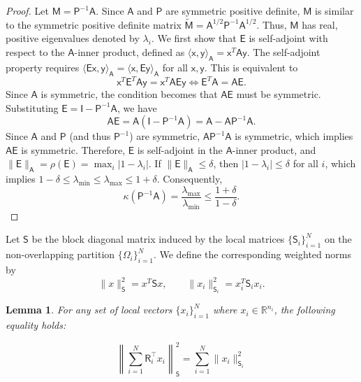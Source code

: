 \documentclass[preprint,12pt]{elsarticle}
\newtheorem{lemma}[theorem]{Lemma} %
\begin{document}
  \begin{proof}
    Let $\mathsf{M}= \mathsf{P}^{-1}\mathsf{A}$. Since $\mathsf{A}$ and
    $\mathsf{P}$ are symmetric positive definite, $\mathsf{M}$ is similar to the
    symmetric positive definite matrix $\widetilde{\mathsf{M}}= \mathsf{A}^{1/2}\mathsf{P}
    ^{-1}\mathsf{A}^{1/2}$. Thus, $\mathsf{M}$ has real, positive eigenvalues
    denoted by $\lambda_{i}$. We first show that $\mathsf{E}$ is self-adjoint with
    respect to the $\mathsf{A}$-inner product, defined as
    $\langle \mathsf{x}, \mathsf{y}\rangle_{\mathsf{A}}= \mathsf{x}^{T}\mathsf{A}
    \mathsf{y}$. The self-adjoint property requires $\langle \mathsf{E}\mathsf{x}
    , \mathsf{y}\rangle_{\mathsf{A}}= \langle \mathsf{x}, \mathsf{E}\mathsf{y}\rangle
    _{\mathsf{A}}$ for all $\mathsf{x}, \mathsf{y}$. This is equivalent to
    \[
      \mathsf{x}^{T}\mathsf{E}^{T}\mathsf{A}\mathsf{y}= \mathsf{x}^{T}\mathsf{A}\mathsf{E}
      \mathsf{y}\iff \mathsf{E}^{T}\mathsf{A}= \mathsf{A}\mathsf{E}.
    \]
    Since $\mathsf{A}$ is symmetric, the condition becomes that $\mathsf{A}\mathsf{E}$
    must be symmetric. Substituting
    $\mathsf{E}= \mathsf{I}- \mathsf{P}^{-1}\mathsf{A}$, we have
    \[
      \mathsf{A}\mathsf{E}= \mathsf{A}(\mathsf{I}- \mathsf{P}^{-1}\mathsf{A})= \mathsf{A}
      - \mathsf{A}\mathsf{P}^{-1}\mathsf{A}.
    \]
    Since $\mathsf{A}$ and $\mathsf{P}$ (and thus $\mathsf{P}^{-1}$) are symmetric,
    $\mathsf{A}\mathsf{P}^{-1}\mathsf{A}$ is symmetric, which implies $\mathsf{A}
    \mathsf{E}$ is symmetric. Therefore, $\mathsf{E}$ is self-adjoint in the $\mathsf{A}$-inner
    product, and
    $\|\mathsf{E}\|_{\mathsf{A}}= \rho(\mathsf{E})= \max_{i}|1 - \lambda_{i}|$. If
    $\|\mathsf{E}\|_{\mathsf{A}}\le \delta$, then $|1 - \lambda_{i}| \le \delta$
    for all $i$, which implies $1 - \delta \le \lambda_{\min}\le \lambda_{\max}\le
    1 + \delta$. Consequently,
    \[
      \kappa(\mathsf{P}^{-1}\mathsf{A}) = \frac{\lambda_{\max}}{\lambda_{\min}}\le
      \frac{1+\delta}{1-\delta}.
    \]
  \end{proof}
  Let $\mathsf{S}$ be the block diagonal matrix induced by the local matrices
  $\{ \mathsf{S}_{i}\}_{i=1}^{N}$ on the non-overlapping partition
  $\{\Omega_{i}\}_{i=1}^{N}$. We define the corresponding weighted norms by
  \[
    \|x\|_{\mathsf{S}}^{2}= x^{T}\mathsf{S}x, \qquad \|x_{i}\|_{\mathsf{S}_{i}}^{2}
    = x_{i}^{T}\mathsf{S}_{i}x_{i}.
  \]
  \begin{lemma}
    For any set of local vectors $\{x_{i}\}_{i=1}^{N}$ where $x_{i}\in \mathbb{R}
    ^{n_{i}}$, the following equality holds:

    \[
      \left\|\sum_{i=1}^{N}\mathsf{R}_{i}^{\intercal}x_{i}\right\|_{\mathsf{S}}^{2}
      = \sum_{i=1}^{N}\|x_{i}\|_{\mathsf{S}_{i}}^{2}
    \]
  \end{lemma}
\end{document}
